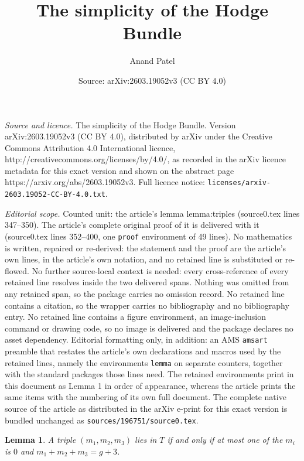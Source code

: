 \documentclass[10pt,a4paper]{amsart}
\title{The simplicity of the Hodge Bundle}
\author{Anand Patel}
\date{Source: arXiv:2603.19052v3 (CC BY 4.0)}
\newtheorem{lemma}{Lemma}
\begin{document}
\maketitle

\noindent\emph{Source and licence.} The simplicity of the Hodge Bundle. Version arXiv:2603.19052v3 (CC BY 4.0), distributed by arXiv under the Creative Commons Attribution 4.0 International licence, http://creativecommons.org/licenses/by/4.0/, as recorded in the arXiv licence metadata for this exact version and shown on the abstract page https://arxiv.org/abs/2603.19052v3. Full licence notice: \texttt{licenses/arxiv-2603.19052-CC-BY-4.0.txt}.\par\smallskip

\noindent\textit{Editorial scope.} Counted unit: the article's lemma lemma:triples (source0.tex lines 347--350). The article's complete original proof of it is delivered with it (source0.tex lines 352--400, one \texttt{proof} environment of 49 lines). No mathematics is written, repaired or re-derived: the statement and the proof are the article's own lines, in the article's own notation, and no retained line is substituted or re-flowed.  No further source-local context is needed: every cross-reference of every retained line resolves inside the two delivered spans.  Nothing was omitted from any retained span, so the package carries no omission record.  No retained line contains a citation, so the wrapper carries no bibliography and no bibliography entry.  No retained line contains a figure environment, an image-inclusion command or drawing code, so no image is delivered and the package declares no asset dependency.  Editorial formatting only, in addition: an AMS \texttt{amsart} preamble that restates the article's own declarations and macros used by the retained lines, namely the environments \texttt{lemma} on separate counters, together with the standard packages those lines need.  The retained environments print in this document as Lemma 1 in order of appearance, whereas the article prints the same items with the numbering of its own full document.  The complete native source of the article as distributed in the arXiv e-print for this exact version is bundled unchanged as \texttt{sources/196751/source0.tex}.
\begin{lemma}
  \label{lemma:triples} A triple $(m_1, m_2, m_3)$ lies in $T$ if and only if at
  most one of the $m_i$ is $0$ and $m_1 + m_2 + m_3 = g+3$. 
\end{lemma}
\end{document}
